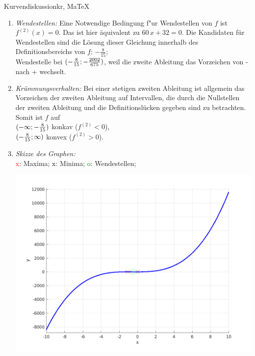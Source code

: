 \begin{MAufgabe}{Kurvendiskussion}{kr, MaTeX}
\begin{enumerate}
 $\MoIl-\infty\MIntvlSep- \frac{16}{15}\MoIr$ monoton wachsend, \\ 
 $\MoIl- \frac{16}{15}\MIntvlSep0\MoIr$ monoton  fallend, \\ 
 $\MoIl0\MIntvlSep \infty\MoIr$ monoton wachsend. \\ 
 \item \emph{Wendestellen:} 
 Eine Notwendige Bedingung f"ur Wendestellen von $f$ ist $f^{(2)}(x)=0$. 
 Das ist hier \"aquivalent zu $60\, x + 32=0$. 
 Die Kandidaten f\"ur Wendestellen sind die L\"osung dieser Gleichung innerhalb des Definitionsbereichs von $f$: $- \frac{8}{15}$; \\ 
 Wendestelle bei $(- \frac{8}{15};- \frac{2002}{675})$, weil die zweite Ableitung das Vorzeichen von - nach + wechselt. \\ 
 \item \emph{Kr\"ummungsverhalten:} 
 Bei einer stetigen zweiten Ableitung ist allgemein das Vorzeichen der zweiten Ableitung auf Intervallen, die durch die Nullstellen der zweiten Ableitung und die Definitionsl\"ucken gegeben sind zu betrachten. 
 Somit ist $f$ auf \\ 
 $(-\infty ;- \frac{8}{15})$  konkav ($f^{(2)}<0$), \\ 
 $(- \frac{8}{15}; \infty)$  konvex ($f^{(2)}>0$). \\ 
 \item \emph{Skizze des Graphen:} \\ 
 {\textcolor{red} x}: Maxima; {\textcolor{black} x}: Minima; {\textcolor{green} o}: Wendestellen; 
  \begin{center}
  \includegraphics[width=0.8\linewidth]{Abb_zur_Ag_autogenerated_fractions_7.png} \end{center}
  
 \end{enumerate}
 \else\relax\fi
  \end{MAufgabe}